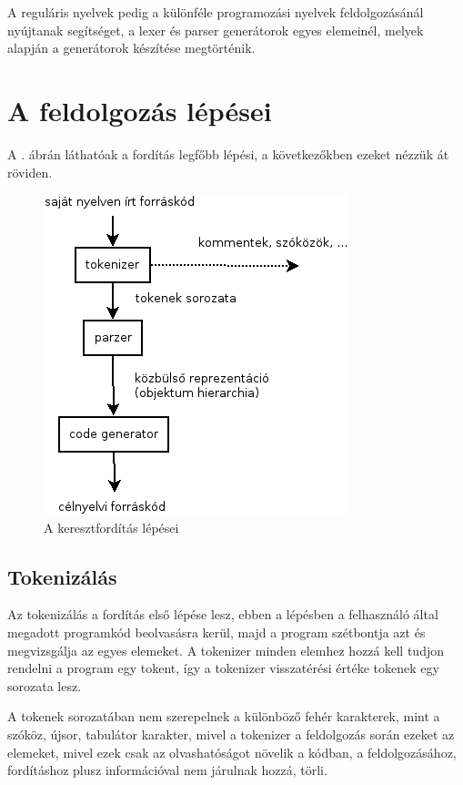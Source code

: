A reguláris nyelvek pedig a különféle programozási nyelvek feldolgozásánál nyújtanak segítséget, a lexer és parser generátorok egyes elemeinél, melyek alapján a generátorok készítése megtörténik.



\section{A feldolgozás lépései}

A . ábrán láthatóak a fordítás legfőbb lépési, a következőkben ezeket nézzük át röviden.

\begin{figure}
\centering
\includegraphics[scale=1]{kepek/process.png}
\caption{A keresztfordítás lépései}
\label{fig:process}
\end{figure}

\subsection{Tokenizálás}

Az tokenizálás a fordítás első lépése lesz, ebben a lépésben a felhasználó által megadott programkód beolvasásra kerül, majd a program szétbontja azt és megvizsgálja az egyes elemeket. A tokenizer minden elemhez hozzá kell tudjon rendelni a program egy tokent, így a tokenizer visszatérési értéke tokenek egy sorozata lesz.

A tokenek sorozatában nem szerepelnek a különböző fehér karakterek, mint a szóköz, újsor, tabulátor karakter, mivel a tokenizer a feldolgozás során ezeket az elemeket, mivel ezek csak az olvashatóságot növelik a kódban, a feldolgozásához, fordításhoz plusz információval nem járulnak hozzá, törli.

